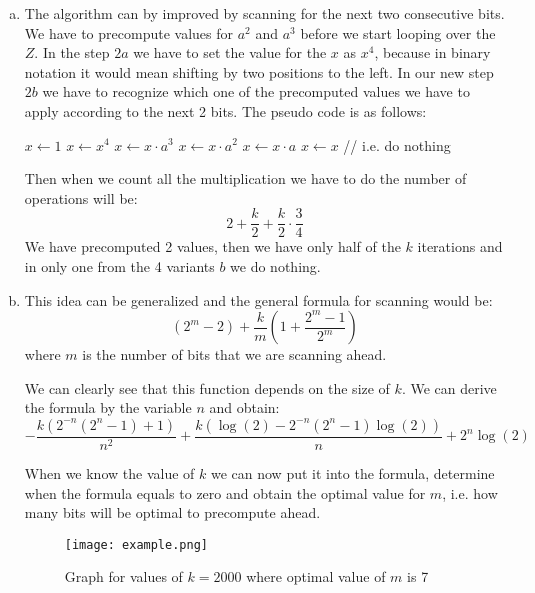 \documentclass[a4paper,10pt]{article}
\begin{document}
\begin{enumerate}[a)]
\item The algorithm can by improved by scanning for the next two consecutive bits. We have to precompute values for $a^2$ and $a^3$ before we start looping over the $Z$.
In the step $2a$ we have to set the value for the $x$ as $x^4$, because in binary notation it would mean shifting by two positions to the left. In our new step $2b$ we have to recognize which one of the precomputed values we have to apply according to the next 2 bits. The pseudo code is as follows:
\begin{algorithmic}
\State $x\gets 1$
\State $x\gets x^4$
	\State $x\gets x \cdot a^3$
	\State $x\gets x \cdot a^2$	
	\State $x\gets x \cdot a$
\Else
	\State $x \gets x$ // i.e. do nothing
\EndIf
\EndFor
\end{algorithmic}
Then when we count all the multiplication we have to do the number of operations will be:
$$
2 + \frac{k}{2} + \frac{k}{2}\cdot\frac{3}{4}
$$
We have precomputed 2 values, then we have only half of the $k$ iterations and in only one from the 4 variants $b$ we do nothing.

\item 
This idea can be generalized and the general formula for scanning would be:
$$
(2^m-2) + \frac{k}{m} \left( 1 + \frac{2^m - 1}{2^m} \right)
$$
where $m$ is the number of bits that we are scanning ahead.

We can clearly see that this function depends on the size of $k$. We can derive the formula by the variable $n$ and obtain:
$$
-\frac{k \left(2^{-n} \left(2^n-1\right)+1\right)}{n^2}+\frac{k \left(\log (2)-2^{-n} \left(2^n-1\right) \log (2)\right)}{n}+2^n \log (2)
$$

When we know the value of $k$ we can now put it into the formula, determine when the formula equals to zero and obtain the optimal value for $m$, i.e. how many bits will be optimal to precompute ahead.

\begin{figure}
\centering
\texttt{[image: example.png]}
\caption{Graph for values of $k=2000$ where optimal value of $m$ is 7}
\end{figure}
\end{enumerate}
\end{document}
